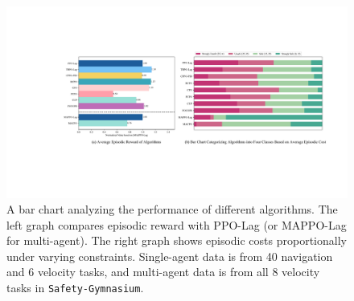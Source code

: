 \documentclass{article}
\begin{document}
\begin{figure}[ht]
\centering
\includegraphics[width=\linewidth]{assets/main-paper/analysis.pdf}
\caption{A bar chart analyzing the performance of different algorithms. The left graph compares episodic reward with PPO-Lag \cite{ray2019benchmarking} (or MAPPO-Lag \cite{gu2021multi} for multi-agent). The right graph shows episodic costs proportionally under varying constraints. Single-agent data is from 40 navigation and 6 velocity tasks, and multi-agent data is from all 8 velocity tasks in \texttt{Safety-Gymnasium}.}
\label{rew-cost-oscil-analysis}
\end{figure}
\end{document}
